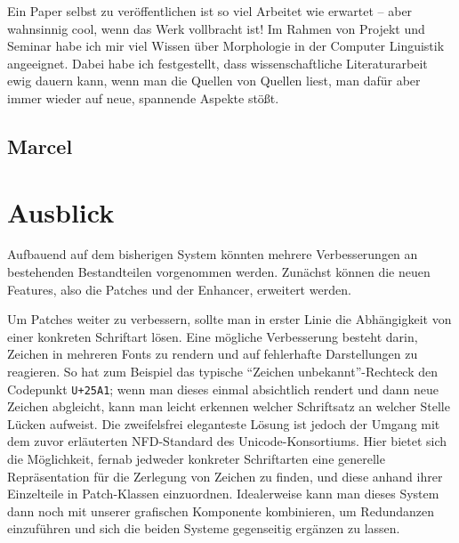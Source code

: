 \documentclass[11pt,a4paper]{article}
\begin{document}

Ein Paper selbst zu veröffentlichen ist so viel Arbeitet wie erwartet -- aber wahnsinnig cool, wenn das Werk vollbracht ist!
Im Rahmen von Projekt und Seminar habe ich mir viel Wissen über Morphologie in der Computer Linguistik angeeignet.
Dabei habe ich festgestellt, dass wissenschaftliche Literaturarbeit ewig dauern kann, wenn man die Quellen von Quellen liest, man dafür aber immer wieder auf neue, spannende Aspekte stößt.


\subsection{Marcel}

\section{Ausblick}
\label{sec:future_work}

Aufbauend auf dem bisherigen System könnten mehrere Verbesserungen an bestehenden Bestandteilen vorgenommen werden.
Zunächst können die neuen Features, also die Patches und der Enhancer, erweitert werden.

Um Patches weiter zu verbessern, sollte man in erster Linie die Abhängigkeit von einer konkreten Schriftart lösen. Eine mögliche Verbesserung besteht darin, Zeichen in mehreren Fonts zu rendern und auf fehlerhafte Darstellungen zu reagieren. So hat zum Beispiel das typische \enquote{Zeichen unbekannt}-Rechteck den Codepunkt \texttt{U+25A1}; wenn man dieses einmal absichtlich rendert und dann neue Zeichen abgleicht, kann man leicht erkennen welcher Schriftsatz an welcher Stelle Lücken aufweist.
Die zweifelsfrei eleganteste Lösung ist jedoch der Umgang mit dem zuvor erläuterten NFD-Standard des Unicode-Konsortiums. Hier bietet sich die Möglichkeit, fernab jedweder konkreter Schriftarten eine generelle Repräsentation für die Zerlegung von Zeichen zu finden, und diese anhand ihrer Einzelteile in Patch-Klassen einzuordnen. Idealerweise kann man dieses System dann noch mit unserer grafischen Komponente kombinieren, um Redundanzen einzuführen und sich die beiden Systeme gegenseitig ergänzen zu lassen.
\end{document}
